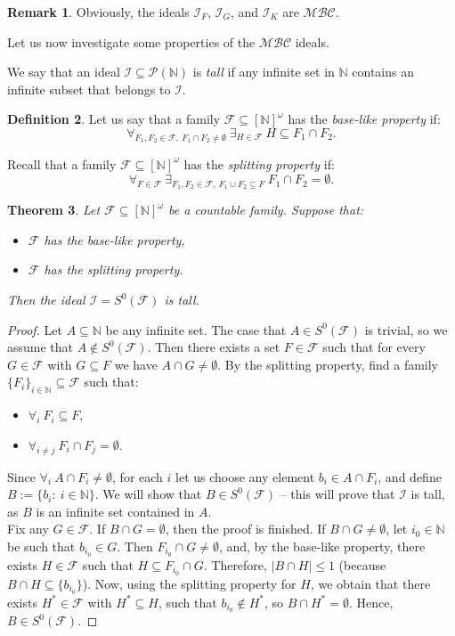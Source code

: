 \documentclass{amsart}
\newtheorem{thm}{Theorem}[section]
\theoremstyle{definition}
\newtheorem{df}[thm]{Definition}
\newtheorem{remark}[thm]{Remark}
\newcommand{\N}{{\mathbb N}}
\newcommand{\I}{\mathcal I}
\newcommand{\InfSubs}{[\N]^{\omega}}
\newcommand{\MB}{S^0}
\newcommand{\MBC}{\mathcal{MBC}}
\begin{document}
\begin{remark} 
Obviously, the ideals $\I_F$, $\I_G$, and $\I_K$ are $\MBC$.
\end{remark}

Let us now investigate some properties of the $\MBC$ ideals.

We say that an ideal $\mathcal{I}\subseteq\mathcal{P}(\N)$ is \emph{tall} if any infinite set in $\N$ contains an infinite subset that belongs to $\mathcal{I}$.

\begin{df}
Let us say that a family $\mathcal{F}\subseteq \InfSubs$ has the \emph{base-like property} if:
$$\forall_{F_1, F_2\in\mathcal{F},\ F_1\cap F_2\neq\emptyset}\ \exists_{H\in\mathcal{F}}\ H\subseteq F_1\cap F_2.$$
\end{df}

Recall that a family $\mathcal{F} \subseteq \InfSubs$ has the \emph{splitting property} if: 
$$\forall_{F\in\mathcal{F}}\ \exists_{F_1,F_2\in\mathcal{F},\ F_1\cup F_2 \subseteq F}\ F_1\cap F_2 = \emptyset.$$

\begin{thm} \label{thmtall}
Let $\mathcal{F}\subseteq \InfSubs$ be a countable family. Suppose that: 
\begin{itemize}
	\item[$(i)$] $\mathcal{F}$ has the base-like property,
	\item[$(ii)$] $\mathcal{F}$ has the splitting property.
\end{itemize}
Then the ideal $\I=\MB(\mathcal{F})$ is tall.
\end{thm}

\begin{proof}
Let $A \subseteq\N$ be any infinite set. 
The case that $A\in \MB(\mathcal{F})$ is trivial, 
so we assume that $A\notin \MB(\mathcal{F})$. Then there exists a set $F\in\mathcal{F}$ such that for every $G\in\mathcal{F}$ with $G\subseteq F$ we have $A\cap G \neq\emptyset$. By the splitting property, find a family $\{F_i\}_{i\in\N} \subseteq\mathcal{F}$ such that:
\begin{itemize}
\item $\forall_{i}\ F_i \subseteq F$,
\item $\forall_{i\neq j}\ F_i\cap F_j =\emptyset$.
\end{itemize}
Since $\forall_{i}\ A\cap F_i \neq\emptyset$, for each $i$ let us choose any element $b_i \in A\cap F_i$, and define $B:=\{b_i :\ i\in\N\}$. We will show that $B\in\MB(\mathcal{F})$ -- this will prove that $\I$ is tall, as $B$ is an infinite set contained in $A$.\\
Fix any $G\in \mathcal{F}$. If $B\cap G=\emptyset$, then the proof is finished. If $B\cap G \neq\emptyset$, let $i_0\in\N$ be such that $b_{i_0}\in G$. Then $F_{i_0}\cap G \neq\emptyset$, and, by the base-like property, there exists $H\in\mathcal{F}$ such that $H\subseteq F_{i_0}\cap G$. Therefore, $|B\cap H|\leq 1$ (because $B\cap H\subseteq\{b_{i_0}\}$). Now, using the splitting property for $H$, we obtain that there exists $H^*\in\mathcal{F}$ with $H^*\subseteq H$, such that $b_{i_0}\notin H^*$, so $B\cap H^* =\emptyset$. Hence, $B\in\MB(\mathcal{F})$.
\end{proof}
\end{document}
